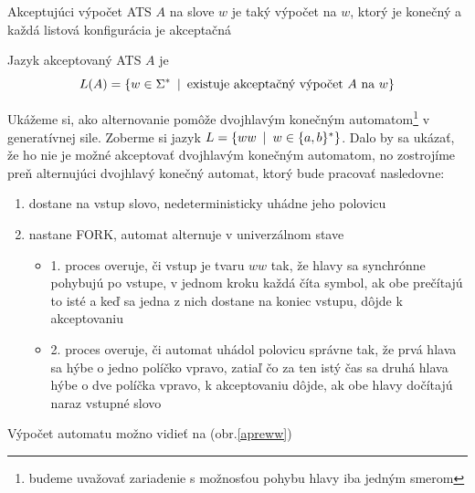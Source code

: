 \begin{definicia}
  Akceptujúci výpočet ATS $A$ na slove $w$ je taký výpočet na $w$,
  ktorý je konečný a každá listová konfigurácia je akceptačná
\end{definicia}

\begin{definicia}
  Jazyk akceptovaný ATS $A$ je
  \[
  L(A)=\{w\in\Sigma^*\enspace |\enspace \mbox{existuje akceptačný výpočet}\ A\
  \mbox{na}\ w\}
  \]
\end{definicia}

\begin{priklad}\label{dvojhlavy}
  Ukážeme si, ako alternovanie pomôže dvojhlavým konečným
  automatom\footnote{budeme uvažovať zariadenie s možnosťou pohybu
  hlavy iba jedným smerom} v ge\-ne\-ra\-tív\-nej sile. Zoberme si
  jazyk $L=\{ww\enspace |\enspace w\in\{a,b\}^*\}$. Dalo by sa ukázať, že ho nie je
  možné akceptovať dvojhlavým konečným automatom, no zostrojíme preň
  alternujúci dvojhlavý konečný automat, ktorý bude pracovať
  nasledovne:
  \begin{enumerate}
    \item dostane na vstup slovo, nedeterministicky uhádne jeho
    polovicu
    \item nastane FORK, automat alternuje v univerzálnom stave
    \begin{itemize}
      \item 1. proces overuje, či vstup je tvaru $ww$ tak, že hlavy sa
        synchrónne pohybujú po vstupe, v jednom kroku každá číta symbol,
        ak obe prečítajú to isté a keď sa jedna z nich dostane na koniec
        vstupu, dôjde k akceptovaniu
      \item 2. proces overuje, či automat uhádol polovicu správne tak,
        že prvá hlava sa hýbe o jedno políčko vpravo, zatiaľ čo za ten
        istý čas sa druhá hlava hýbe o dve políčka vpravo, k akceptovaniu
        dôjde, ak obe hlavy dočítajú naraz vstupné slovo
    \end{itemize}
  \end{enumerate}
  Výpočet automatu možno vidieť na (obr.\ref{apreww})
\end{priklad}

